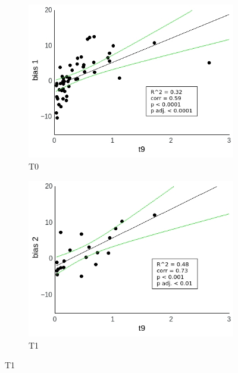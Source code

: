 \documentclass[a4paper]{scrreprt}
\begin{document}
\begin{figure}
\centering
\begin{subfigure}[b]{0.49\textwidth}
        \includegraphics[width=\textwidth]{figs/sec3/t9/t9_diff_1_mod1dat.jpeg}
        \caption{T0}
    \end{subfigure}
    \begin{subfigure}[b]{0.49\textwidth}
        \includegraphics[width=\textwidth]{figs/sec3/t9/t9_diff_2_mod1dat.jpeg}
        \caption{T1}
    \end{subfigure}


\end{figure}
\end{document}
